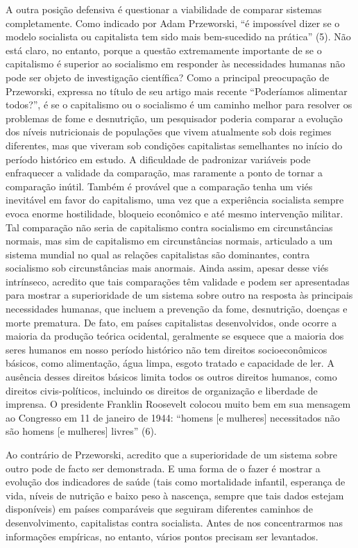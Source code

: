 \documentclass[twocolumn,amsmath,amssymb,aps,pre,floatfix]{revtex4-2}
\begin{document}
A outra posição defensiva é questionar a viabilidade de comparar sistemas completamente. Como indicado por Adam Przeworski, “é impossível dizer se o modelo socialista ou capitalista tem sido mais bem-sucedido na prática” (5). Não está claro, no entanto, porque a questão extremamente importante de se o capitalismo é superior ao socialismo em responder às necessidades humanas não pode ser objeto de investigação científica? Como a principal preocupação de Przeworski, expressa no título de seu artigo mais recente “Poderíamos alimentar todos?”, é se o capitalismo ou o socialismo é um caminho melhor para resolver os problemas de fome e desnutrição, um pesquisador poderia comparar a evolução dos níveis nutricionais de populações que vivem atualmente sob dois regimes diferentes, mas que viveram sob condições capitalistas semelhantes no início do período histórico em estudo. A dificuldade de padronizar variáveis ​​pode enfraquecer a validade da comparação, mas raramente a ponto de tornar a comparação inútil. Também é provável que a comparação tenha um viés inevitável em favor do capitalismo, uma vez que a experiência socialista sempre evoca enorme hostilidade, bloqueio econômico e até mesmo intervenção militar. Tal comparação não seria de capitalismo contra socialismo em circunstâncias normais, mas sim de capitalismo em circunstâncias normais, articulado a um sistema mundial no qual as relações capitalistas são dominantes, contra socialismo sob circunstâncias mais anormais. Ainda assim, apesar desse viés intrínseco, acredito que tais comparações têm validade e podem ser apresentadas para mostrar a superioridade de um sistema sobre outro na resposta às principais necessidades humanas, que incluem a prevenção da fome, desnutrição, doenças e morte prematura. De fato, em países capitalistas desenvolvidos, onde ocorre a maioria da produção teórica ocidental, geralmente se esquece que a maioria dos seres humanos em nosso período histórico não tem direitos socioeconômicos básicos, como alimentação, água limpa, esgoto tratado e capacidade de ler. A ausência desses direitos básicos limita todos os outros direitos humanos, como direitos civis-políticos, incluindo os direitos de organização e liberdade de imprensa. O presidente Franklin Roosevelt colocou muito bem em sua mensagem ao Congresso em 11 de janeiro de 1944: “homens [e mulheres] necessitados não são homens [e mulheres] livres” (6).
\par
Ao contrário de Przeworski, acredito que a superioridade de um sistema sobre outro pode de facto ser demonstrada. E uma forma de o fazer é mostrar a evolução dos indicadores de saúde (tais como mortalidade infantil, esperança de vida, níveis de nutrição e baixo peso à nascença, sempre que tais dados estejam disponíveis) em países comparáveis ​​que seguiram diferentes caminhos de desenvolvimento, capitalistas contra socialista. Antes de nos concentrarmos nas informações empíricas, no entanto, vários pontos precisam ser levantados.
\end{document}
